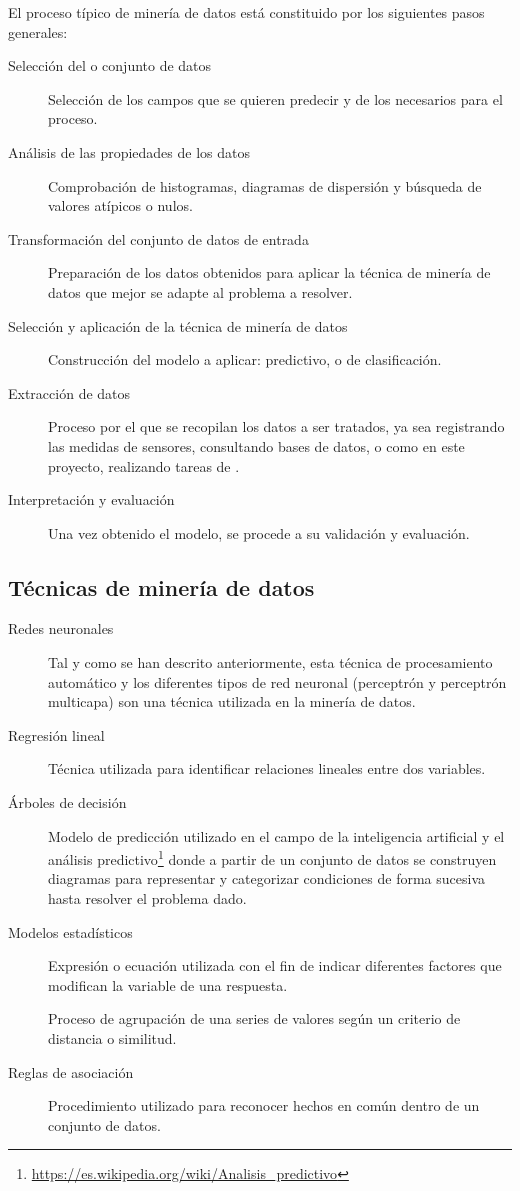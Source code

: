 El proceso típico de minería de datos está constituido por los siguientes pasos generales:

\begin{description}
    \item[Selección del  o conjunto de datos] Selección de los campos que se quieren predecir y de los necesarios para el proceso.
    \item[Análisis de las propiedades de los datos] Comprobación de histogramas, diagramas de dispersión y búsqueda de valores atípicos o nulos.
    \item[Transformación del conjunto de datos de entrada] Preparación de los datos obtenidos para aplicar la técnica de minería de datos que mejor se adapte al problema a resolver.
    \item[Selección y aplicación de la técnica de minería de datos] Construcción del modelo a aplicar: predictivo, o de clasificación.
    \item[Extracción de datos] Proceso por el que se recopilan los datos a ser tratados, ya sea registrando las medidas de sensores, consultando bases de datos, o como en este proyecto, realizando tareas de .
    \item[Interpretación y evaluación] Una vez obtenido el modelo, se procede a su validación y evaluación.
\end{description}

\subsection{Técnicas de minería de datos}
\begin{description}
    \item[Redes neuronales] Tal y como se han descrito anteriormente, esta técnica de procesamiento automático y los diferentes tipos de red neuronal (perceptrón y perceptrón multicapa) son una técnica utilizada en la minería de datos.
    \item[Regresión lineal] Técnica utilizada para identificar relaciones lineales entre dos variables.
    \item[Árboles de decisión] Modelo de predicción utilizado en el campo de la inteligencia artificial y el análisis predictivo\footnote{\url{https://es.wikipedia.org/wiki/Analisis\_predictivo}} donde a partir de un conjunto de datos se construyen diagramas para representar y categorizar condiciones de forma sucesiva hasta resolver el problema dado.
    \item[Modelos estadísticos]Expresión o ecuación utilizada con el fin de indicar diferentes factores que modifican la variable de una respuesta.
    \item[] Proceso de agrupación de una series de valores según un criterio de distancia o similitud.
    \item[Reglas de asociación] Procedimiento utilizado para reconocer hechos en común dentro de un conjunto de datos.
\end{description}

